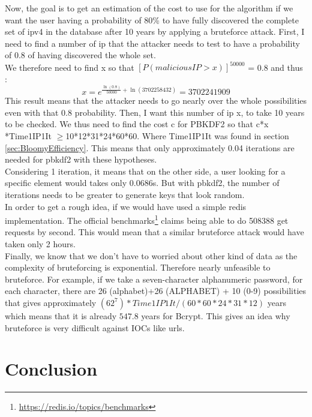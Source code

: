 \documentclass{eplmastersthesis}
\begin{document}
Now, the goal is to get an estimation of the cost to use for the algorithm if we want the user having a probability of 80\% to have fully discovered the complete set of \gls{ipv4} in the database after 10 years by applying a bruteforce attack.
First, I need to find a number of \gls{ip} that the attacker needs to test to have a probability of 0.8 of having discovered the whole set.\\

We therefore need to find x so that $\left[ P(malicious IP > x)\right]^50000$ = 0.8 and thus :
$$x = e^{\frac{\ln(0.8)}{50000} + \ln(3 702 258 432)} = 3702241909$$
This result means that the attacker needs to go nearly over the whole possibilities even with that 0.8 probability.
Then, I want this number of \gls{ip} x, to take 10 years to be checked. We thus need to find the cost c for PBKDF2 so that c*x *Time1IP1It $\geq$10*12*31*24*60*60. Where Time1IP1It was found in section \ref{sec:BloomyEfficiency}. This means that only approximately 0.04 iterations are needed for \gls{pbkdf2} with these hypotheses.\\
Considering 1 iteration, it means that on the other side, a user looking for a specific element would takes only 0.0686s. But with \gls{pbkdf2}, the number of iterations needs to be greater to generate keys that look random.\\

In order to get a rough idea, if we would have used a simple redis implementation. The official benchmarks\footnote{\url{https://redis.io/topics/benchmarks}} claims being able to do 508388 get requests by second. This would mean that a similar bruteforce attack would have taken only 2 hours.\\

Finally, we know that we don't have to worried about other kind of data as the complexity of bruteforcing is exponential.
Therefore nearly unfeasible to bruteforce. For example, if we take a seven-character alphanumeric password, for each character, there are 26 (alphabet)+26 (ALPHABET) + 10 (0-9) possibilities that gives approximately $(62^7)*Time1IP1It/(60*60*24*31*12)$ years which means that it is already $547.8$ years for Bcrypt.
This gives an idea why bruteforce is very difficult against IOCs like \gls{url}s.\\ 


\chapter{Conclusion}
\end{document}
